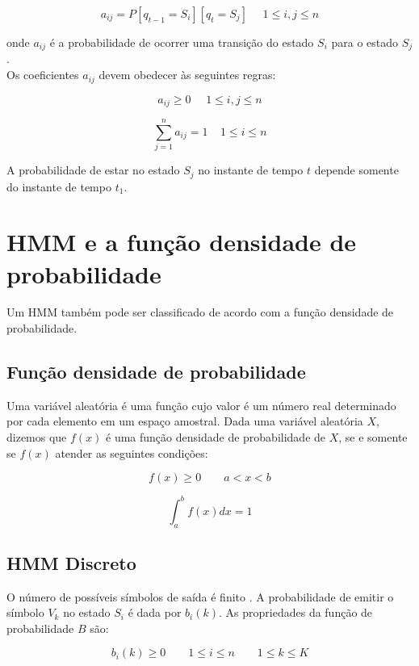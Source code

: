  \begin{equation}
 a_{ij} =  P [q_{t-1} = S_i] [q_t = S_j]~~\textrm{ }~ 1 \leq i, j\leq n
\end{equation}

onde $a_{ij}$ é a probabilidade de ocorrer uma transição do estado $S_i$ para o estado $S_j$.\\
Os coeficientes $a_{ij}$ devem obedecer às seguintes regras:

\begin{equation}
a_{ij} \geq 0~~\textrm{ }~ 1 \leq i,j \leq n 
\end{equation}

\begin{equation}
\displaystyle \sum_{j=1}^n a_{ij} = 1~\textrm{ }~ 1 \leq i \leq n 
\end{equation}

A probabilidade de estar no estado $S_j$ no instante de tempo $t$ depende somente do instante de tempo $t_1$.\\


\section{HMM e a função densidade de probabilidade}

\quad Um HMM também pode ser classificado de acordo com a função densidade de probabilidade. 

\subsection{Função densidade de probabilidade}
\quad Uma variável aleatória é uma função cujo valor é um número real determinado por cada elemento em um espaço amostral. Dada uma variável aleatória $X$, dizemos que $f(x)$ é uma função densidade de probabilidade de $X$, se e somente se $f(x)$ atender as seguintes condições:

$$
\displaystyle f(x) \geq 0  \qquad a < x < b
$$


$$
\displaystyle \int_a^b f(x)dx = 1 
$$

\subsection{HMM Discreto}
\quad O número de possíveis símbolos de saída é finito \cite{fundRecFala}. A probabilidade de emitir o símbolo $V_k$ no estado $S_i$ é dada por $b_i(k)$. As propriedades da função de probabilidade $B$ são:

$$
\displaystyle b_i (k) \geq 0 \qquad 1 \leq i \leq n  \qquad 1 \leq k \leq K
$$

